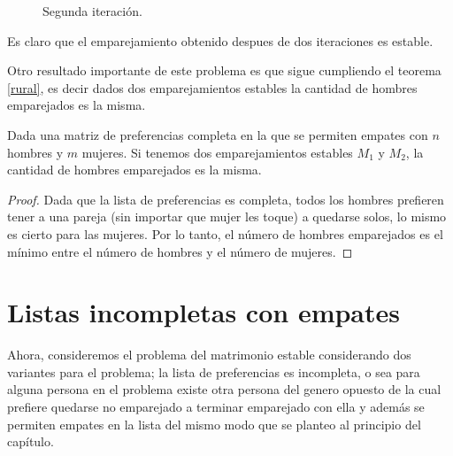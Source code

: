 \begin{eje}
\begin{figure}[H]

\caption{Segunda iteración.}
\end{figure}

Es claro que el emparejamiento obtenido despues de dos iteraciones es estable.
\end{eje}

Otro resultado importante de este problema es que sigue cumpliendo el teorema \ref{rural}, es decir dados dos emparejamientos estables la cantidad de hombres emparejados es la misma.

\begin{cor}
Dada una matriz de preferencias completa en la que se permiten empates con $n$ hombres y $m$ mujeres. Si tenemos dos emparejamientos estables $M_1$ y $M_2$, la cantidad de hombres emparejados es la misma.
\end{cor}
\begin{proof}
Dada que la lista de preferencias es completa, todos los hombres prefieren tener a una pareja (sin importar que mujer les toque) a quedarse solos, lo mismo es cierto para las mujeres. Por lo tanto, el número de hombres emparejados es el mínimo entre el número de hombres y el número de mujeres. 
\end{proof}

\section{Listas incompletas con empates}
Ahora, consideremos el problema del matrimonio estable considerando dos variantes para el problema; la lista de preferencias es incompleta, o sea para alguna persona en el problema existe otra persona del genero opuesto de la cual prefiere quedarse no emparejado a terminar emparejado con ella y además se permiten empates en la lista del mismo modo que se planteo al principio del capítulo. 

